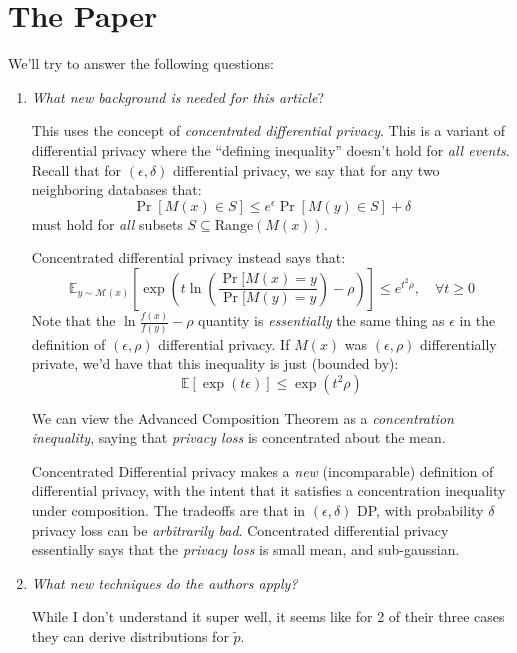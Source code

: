 \documentclass{article}
\begin{document}
\section{The Paper}
We'll try to answer the following questions:
\begin{enumerate}
\item \emph{What new background is needed for this article}?

This uses the concept of \emph{concentrated differential privacy}.
This is a variant of differential privacy where the ``defining inequality'' doesn't hold for \emph{all events}.
Recall that for $(\epsilon,\delta)$ differential privacy, we say that for any two neighboring databases that:
\begin{equation}
\Pr[M(x) \in S]\leq e^{\epsilon}\Pr[M(y)\in S] + \delta
\end{equation}
must hold for \emph{all} subsets $S\subseteq\text{Range}(M(x))$.

Concentrated differential privacy instead says that:
\begin{equation}
\mathbb{E}_{y\sim\mathcal{M}(x)}[\exp(t\ln(\frac{\Pr[M(x) = y}{\Pr[M(y) = y}) - \rho)]\leq e^{t^2\rho},\quad \forall t\geq 0
\end{equation}
Note that the $\ln\frac{f(x)}{f(y)} - \rho$ quantity is \emph{essentially} the same thing as $\epsilon$ in the definition of $(\epsilon,\rho)$ differential privacy.
If $M(x)$ was $(\epsilon,\rho)$ differentially private, we'd have that this inequality is just (bounded by):
\begin{equation}
\mathbb{E}[\exp(t\epsilon)] \leq \exp(t^2\rho)
\end{equation}

We can view the Advanced Composition Theorem as a \emph{concentration inequality}, saying that \emph{privacy loss} is concentrated about the mean.

Concentrated Differential privacy makes a \emph{new} (incomparable) definition of differential privacy, with the intent that it satisfies a concentration inequality under composition.
The tradeoffs are that in $(\epsilon,\delta)$ DP, with probability $\delta$ privacy loss can be \emph{arbitrarily bad}.
Concentrated differential privacy essentially says that the \emph{privacy loss} is small mean, and sub-gaussian.


\item \emph{What new techniques do the authors apply?}

While I don't understand it super well, it seems like for 2 of their three cases they can derive distributions for $\tilde{p}$.


\end{enumerate}
\end{document}
